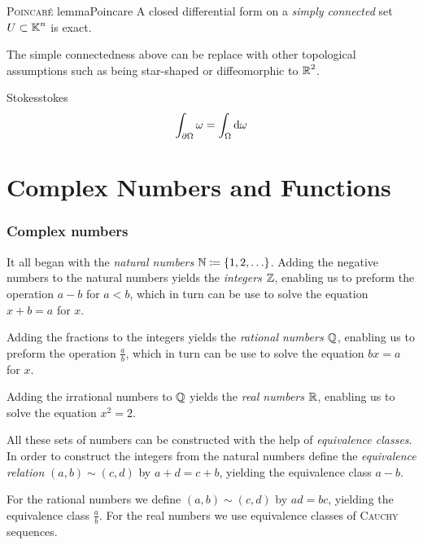 \documentclass[a4paper,english]{article}
\begin{document}
\begin{thm}{\textsc{Poincaré} lemma}{Poincare}
    A closed differential form on a \emph{simply connected} set $U \subset \operatorname{\mathbb{K}}^n$ is exact.
\end{thm}

\begin{remark}
    The simple connectedness above can be replace with other topological assumptions such as being star-shaped or diffeomorphic to $\operatorname{\mathbb{R}}^2$.
\end{remark}

\begin{thm}{Stokes}{stokes}
    \begin{equation*}
        \int_{\partial \Omega} \omega
        = \int_{\Omega} \mathop{}\!\mathrm{d}{\omega}
    \end{equation*}
\end{thm}

\section{Complex Numbers and Functions}
\subsubsection{Complex numbers}
\footnotesize
It all began with the \emph{natural numbers} $\operatorname{\mathbb{N}} \coloneqq \{1, 2, \ldots \}$.
Adding the negative numbers to the natural numbers yields the \emph{integers $\operatorname{\mathbb{Z}}$}, enabling us to preform the operation $a - b$ for $a < b$, which in turn can be use to solve the equation $x + b = a$ for $x$.

Adding the fractions to the integers yields the \emph{rational numbers $\operatorname{\mathbb{Q}}$}, enabling us to preform the operation $\frac{a}{b}$, which in turn can be use to solve the equation $b x = a$ for $x$.

Adding the irrational numbers to $\operatorname{\mathbb{Q}}$ yields the \emph{real numbers $\operatorname{\mathbb{R}}$}, enabling us to solve the equation $x^2 = 2$.

All these sets of numbers can be constructed with the help of \emph{equivalence classes}.
In order to construct the integers from the natural numbers define the \emph{equivalence relation} $(a, b) \sim (c, d)$ by $a + d = c + b$, yielding the equivalence class $a - b$.

For the rational numbers we define $(a, b) \sim (c, d)$ by $a d = b c$, yielding the equivalence class $\frac{a}{b}$.
For the real numbers we use equivalence classes of \textsc{Cauchy} sequences.
\end{document}
